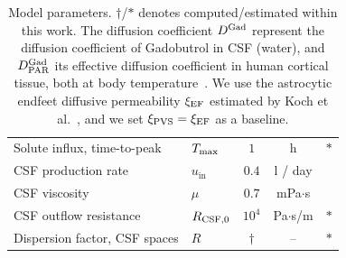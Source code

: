 \documentclass[fleqn,10pt]{wlscirep}
\begin{document}
\begin{table}
\begin{center}
\begin{tabular}{ll|ccc}
      Solute influx, time-to-peak & $T_{\rm max}$ & $1$ & h & $\ast$ \\
      CSF production rate & $u_{\mathrm{in}}$ & $0.4$  & l / day & \cite{nilsson1992circadian} \\
      CSF viscosity & $\mu$ & $0.7$ & mPa$ \cdot $s & \cite{bloomfield1998effects} \\ 
      CSF outflow resistance & $R_{\rm CSF, 0}$ & $10^{4}$  & Pa$\cdot$s/m & $\ast$ \\ 
      Dispersion factor, CSF spaces & $R$ & $\dagger$ & -- & $\ast$ \\
      \bottomrule
    \end{tabular}
  \end{center}
  \caption{Model parameters. $\dagger$/$\ast$ denotes
    computed/estimated within this work. The diffusion coefficient
    $D^{\rm Gad}$ represent the diffusion coefficient of Gadobutrol in
    CSF (water), and $D^{\rm Gad}_{\rm PAR}$ its effective diffusion
    coefficient in human cortical tissue, both at body
    temperature~\cite{sykova2008diffusion, valnes2020apparent,
      hornkjol2022csf}. We use the astrocytic endfeet diffusive permeability
    $\xi_{\rm EF}$ estimated by Koch et al.~\cite{koch2023estimates},
    and we set $\xi_{\rm PVS} = \xi_{\rm EF}$ as a baseline.}
  \label{tab:parameters}
\end{table}
\newcommand{\blue}[1]{\textcolor{blue}{#1}}
\end{document}
